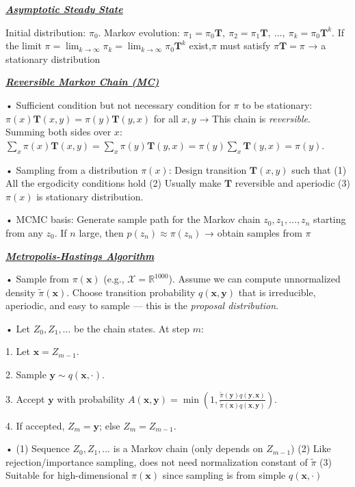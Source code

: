 \documentclass[10pt]{article}
\newcommand{\bulletPoint}[1]{\ul{\textit{\textbf{#1}}}}
\begin{document}
\begin{multicols*}{3}
\bulletPoint{Asymptotic Steady State}\quad

Initial distribution: $\pi_0$. 
Markov evolution: $\pi_1 = \pi_0 \mathbf{T}, \ \pi_2 = \pi_1 \mathbf{T}, \ \dots, \ \pi_k = \pi_0 \mathbf{T}^k$. 
If the limit $\pi = \lim_{k \to \infty} \pi_k = \lim_{k \to \infty} \pi_0 \mathbf{T}^k$ exist,$\pi$ must satisfy $\pi \mathbf{T} = \pi$ → a stationary distribution


\bulletPoint{Reversible Markov Chain (MC)}\quad

• Sufficient condition but not necessary condition for $\pi$ to be stationary: $\pi(x)\mathbf{T}(x,y) = \pi(y)\mathbf{T}(y,x)$ for all $x, y$  
→ This chain is \textit{reversible}. 
Summing both sides over $x$:  
$\sum_x \pi(x)\mathbf{T}(x,y) = \sum_x \pi(y)\mathbf{T}(y,x) = \pi(y)\sum_x \mathbf{T}(y,x) = \pi(y)$. 

• Sampling from a distribution $\pi(x)$: 
Design transition $\mathbf{T}(x,y)$ such that 
(1) All the ergodicity conditions hold  
(2) Usually make $\mathbf{T}$ reversible and aperiodic  
(3) $\pi(x)$ is stationary distribution. 

• MCMC basis:
Generate sample path for the Markov chain $z_0, z_1, \dots, z_n$ starting from any $z_0$.   
If $n$ large, then $p(z_n) \approx \pi(z_n)$  
→ obtain samples from $\pi$


\bulletPoint{Metropolis-Hastings Algorithm} \quad

• Sample from $\pi(\mathbf{x})$ (e.g., $\mathcal{X} = \mathbb{R}^{1000}$). 
Assume we can compute unnormalized density $\tilde{\pi}(\mathbf{x})$. 
Choose transition probability $q(\mathbf{x}, \mathbf{y})$ that is irreducible, aperiodic, and easy to sample — this is the \textit{proposal distribution}. 

• Let $Z_0, Z_1, \dots$ be the chain states. At step $m$:

1. Let $\mathbf{x} = Z_{m-1}$.  

2. Sample $\mathbf{y} \sim q(\mathbf{x}, \cdot)$.   

3. Accept $\mathbf{y}$ with probability  
$A(\mathbf{x}, \mathbf{y}) = \min\left(1, \frac{\tilde{\pi}(\mathbf{y})q(\mathbf{y}, \mathbf{x})}{\tilde{\pi}(\mathbf{x})q(\mathbf{x}, \mathbf{y})} \right)$.   

4. If accepted, $Z_m = \mathbf{y}$; else $Z_m = Z_{m-1}$. 

• (1) Sequence $Z_0, Z_1, \dots$ is a Markov chain (only depends on $Z_{m-1}$)  
(2) Like rejection/importance sampling, does not need normalization constant of $\tilde{\pi}$  
(3) Suitable for high-dimensional $\pi(\mathbf{x})$ since sampling is from simple $q(\mathbf{x}, \cdot)$



\end{multicols*}
\end{document}
